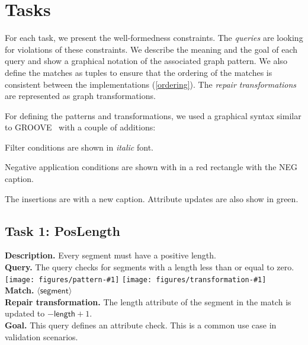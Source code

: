 \documentclass[submission,copyright,creativecommons]{eptcs}
\newcommand{\ttctransformation}[1]{
	\texttt{[image: figures/pattern-\#1]}
	\texttt{[image: figures/transformation-\#1]}
	\\
}
\begin{document}
\section{Tasks}
\label{tasks}

For each task, we present the well-formedness constraints. The \emph{queries} are looking for violations of these constraints. We describe the meaning and the goal of each query and show a graphical notation of the associated graph pattern. We also define the matches as tuples to ensure that the ordering of the matches is consistent between the implementations (\autoref{ordering}). The \emph{repair transformations} are represented as graph transformations.

For defining the patterns and transformations, we used a graphical syntax similar to GROOVE~\cite{rensink2004groove} with a couple of additions:

\begin{compactitem}
  \item Filter conditions are shown in \textit{italic} font.
  \item Negative application conditions are shown with in a \textcolor{negcolor}{red} rectangle with the \textcolor{negcolor}{\textsf{NEG}} caption.
  \item The insertions are with a \textcolor{newcolor}{\guillemotleft{}new\guillemotright{}} caption. Attribute updates are also show in \textcolor{newcolor}{green}. %
\end{compactitem}

\subsection{Task 1: PosLength}
\label{poslength}
\textbf{Description.} Every segment must have a positive length. \\
\textbf{Query.} The query checks for segments with a length less than or equal to zero. \\
\ttctransformation{poslength}
\textbf{Match.} $\langle \mathsf{segment} \rangle$ \\
\textbf{Repair transformation.} The \textsf{length} attribute of the \textsf{segment} in the match is updated to $- \mathsf{length} + 1$. \\
\textbf{Goal.} This query defines an attribute check. This is a common use case in validation scenarios.
\end{document}

